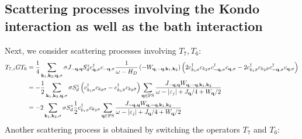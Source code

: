 \documentclass{revtex4-2}
\begin{document}
\subsection{Scattering processes involving the Kondo interaction as well as the bath interaction}
Next, we consider scattering processes involving \(T_7, T_6\):
\begin{equation}\begin{aligned}\label{t7t6}
	T_{7,z} G T_6 &= \frac{1}{4}\sum_{{\bf k}_1,{\bf k}_2,{\bf q},\sigma}\sigma J_{-{\bf q},{\bf q}}S_d^z c^\dagger_{{\bf q},\sigma} c_{-{\bf q},\sigma} \frac{1}{\omega - H_D} \left(- W_{{\bf q},-{\bf q},{\bf k}_1, {\bf k}_2}\right) \left(2 c^\dagger_{k_1\sigma}c_{k_2\sigma}c^\dagger_{-{\bf q},\sigma}c_{{\bf q},\sigma} - 2 c^\dagger_{k_1\bar\sigma}c_{k_2\bar\sigma}c^\dagger_{-{\bf q},\sigma}c_{{\bf q},\sigma}\right)\\
			      &= -\frac{1}{2}\sum_{{\bf k}_1,{\bf k}_2,{\bf q},\sigma}\sigma S_d^z \left(c^\dagger_{k_1\sigma}c_{k_2\sigma} - c^\dagger_{k_1\bar\sigma}c_{k_2\bar\sigma}\right) \sum_{{\bf q} \in \text{PS}}\frac{J_{-{\bf q},{\bf q}} W_{{\bf q},-{\bf q},{\bf k}_1, {\bf k}_2}}{\omega - |\varepsilon_j| + J_{{\bf q}}/4 + W_{{\bf q}}/2} \\
			      &= -2\sum_{{\bf k}_1,{\bf k}_2,\sigma}\sigma S_d^z \frac{1}{2}c^\dagger_{k_1\sigma}c_{k_2\sigma} \sum_{{\bf q} \in \text{PS}}\frac{J_{-{\bf q},{\bf q}} W_{{\bf q},-{\bf q},{\bf k}_1, {\bf k}_2}}{\omega - |\varepsilon_j| + J_{{\bf q}}/4 + W_{{\bf q}}/2} 
\end{aligned}\end{equation}
Another scattering process is obtained by switching the operators \(T_7\) and \(T_6\):
\end{document}
